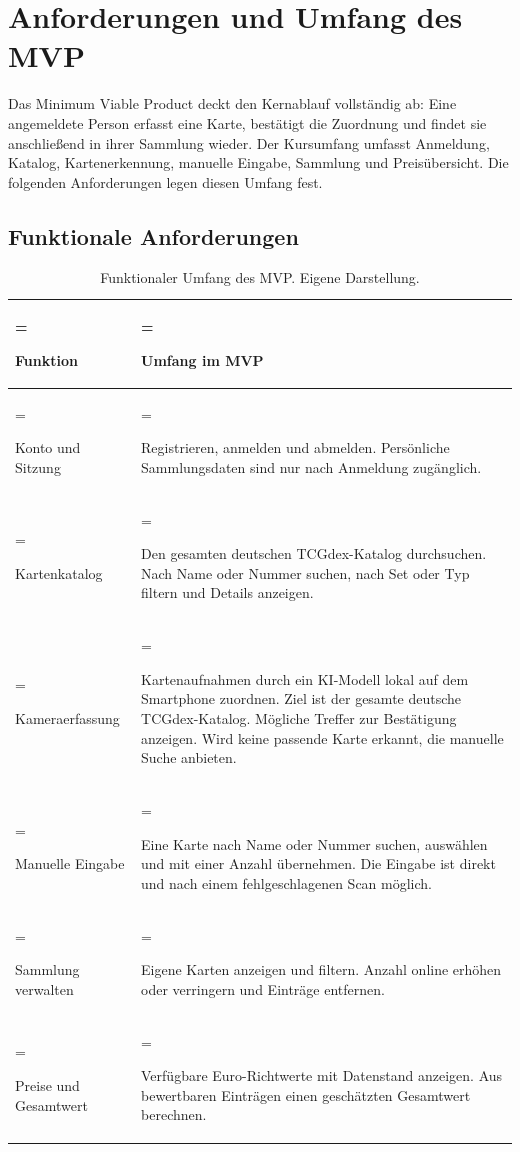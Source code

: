 \section{Anforderungen und Umfang des MVP}

Das Minimum Viable Product deckt den Kernablauf vollständig ab: Eine angemeldete Person erfasst eine Karte, bestätigt die Zuordnung und findet sie anschließend in ihrer Sammlung wieder. Der Kursumfang umfasst Anmeldung, Katalog, Kartenerkennung, manuelle Eingabe, Sammlung und Preisübersicht. Die folgenden Anforderungen legen diesen Umfang fest.

\subsection{Funktionale Anforderungen}
\begin{table}[H]
\centering
\small
\begin{tabularx}{\linewidth}{@{}>{\hsize=0.56\hsize\linewidth=\hsize\raggedright\arraybackslash}X >{\hsize=1.44\hsize\linewidth=\hsize\raggedright\arraybackslash}X@{}}
\toprule
\textbf{Funktion} & \textbf{Umfang im MVP} \\
\midrule
Konto und Sitzung & Registrieren, anmelden und abmelden. Persönliche Sammlungsdaten sind nur nach Anmeldung zugänglich. \\
Kartenkatalog & Den gesamten deutschen TCGdex-Katalog durchsuchen. Nach Name oder Nummer suchen, nach Set oder Typ filtern und Details anzeigen. \\
Kameraerfassung & Kartenaufnahmen durch ein KI-Modell lokal auf dem Smartphone zuordnen. Ziel ist der gesamte deutsche TCGdex-Katalog. Mögliche Treffer zur Bestätigung anzeigen. Wird keine passende Karte erkannt, die manuelle Suche anbieten. \\
Manuelle Eingabe & Eine Karte nach Name oder Nummer suchen, auswählen und mit einer Anzahl übernehmen. Die Eingabe ist direkt und nach einem fehlgeschlagenen Scan möglich. \\
Sammlung verwalten & Eigene Karten anzeigen und filtern. Anzahl online erhöhen oder verringern und Einträge entfernen. \\
Preise und Gesamtwert & Verfügbare Euro-Richtwerte mit Datenstand anzeigen. Aus bewertbaren Einträgen einen geschätzten Gesamtwert berechnen. \\
\bottomrule
\end{tabularx}
\caption{Funktionaler Umfang des MVP. Eigene Darstellung.}
\end{table}
